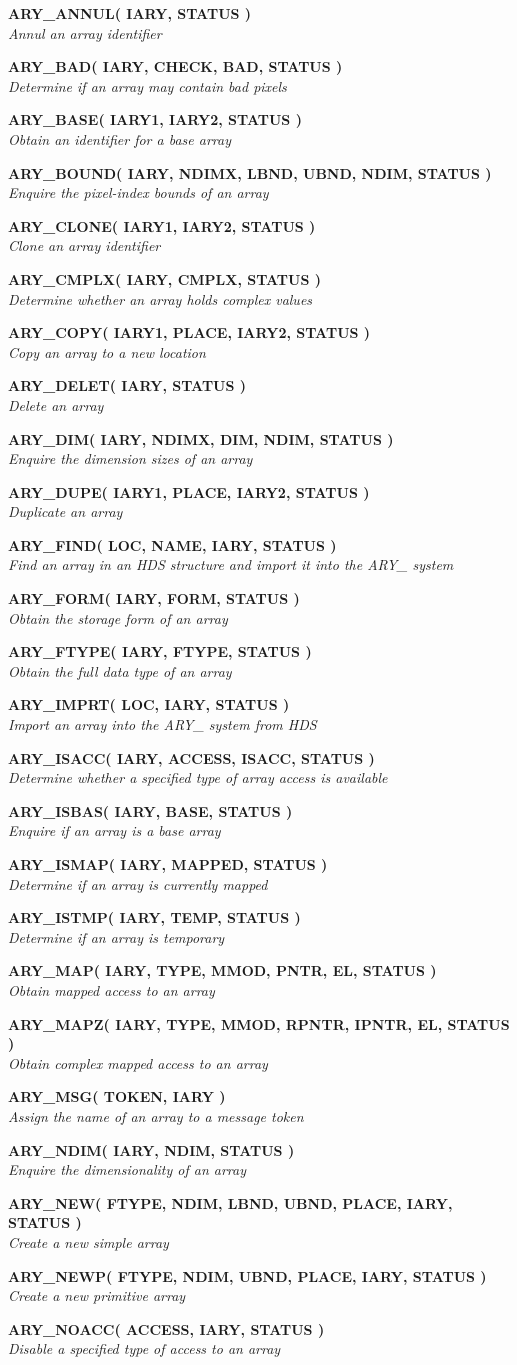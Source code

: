 \documentclass[twoside,11pt]{article}
\newcommand{\noteroutine}[2]{\textbf{#1}\hspace*{\fill}\nopagebreak \\
                             \hspace*{3em}\emph{#2}\hspace*{\fill}\par}
\begin{document}
\noteroutine{ARY\_ANNUL( IARY, STATUS )}
            {Annul an array identifier}
\noteroutine{ARY\_BAD( IARY, CHECK, BAD, STATUS )}
            {Determine if an array may contain bad pixels}
\noteroutine{ARY\_BASE( IARY1, IARY2, STATUS )}
            {Obtain an identifier for a base array}
\noteroutine{ARY\_BOUND( IARY, NDIMX, LBND, UBND, NDIM, STATUS )}
            {Enquire the pixel-index bounds of an array}
\noteroutine{ARY\_CLONE( IARY1, IARY2, STATUS )}
            {Clone an array identifier}
\noteroutine{ARY\_CMPLX( IARY, CMPLX, STATUS )}
            {Determine whether an array holds complex values}
\noteroutine{ARY\_COPY( IARY1, PLACE, IARY2, STATUS )}
            {Copy an array to a new location}
\noteroutine{ARY\_DELET( IARY, STATUS )}
            {Delete an array}
\noteroutine{ARY\_DIM( IARY, NDIMX, DIM, NDIM, STATUS )}
            {Enquire the dimension sizes of an array}
\noteroutine{ARY\_DUPE( IARY1, PLACE, IARY2, STATUS )}
            {Duplicate an array}
\noteroutine{ARY\_FIND( LOC, NAME, IARY, STATUS )}
            {Find an array in an HDS structure and import it into the ARY\_ system}
\noteroutine{ARY\_FORM( IARY, FORM, STATUS )}
            {Obtain the storage form of an array}
\noteroutine{ARY\_FTYPE( IARY, FTYPE, STATUS )}
            {Obtain the full data type of an array}
\noteroutine{ARY\_IMPRT( LOC, IARY, STATUS )}
            {Import an array into the ARY\_ system from HDS}
\noteroutine{ARY\_ISACC( IARY, ACCESS, ISACC, STATUS )}
            {Determine whether a specified type of array access is available}
\noteroutine{ARY\_ISBAS( IARY, BASE, STATUS )}
            {Enquire if an array is a base array}
\noteroutine{ARY\_ISMAP( IARY, MAPPED, STATUS )}
            {Determine if an array is currently mapped}
\noteroutine{ARY\_ISTMP( IARY, TEMP, STATUS )}
            {Determine if an array is temporary}
\noteroutine{ARY\_MAP( IARY, TYPE, MMOD, PNTR, EL, STATUS )}
            {Obtain mapped access to an array}
\noteroutine{ARY\_MAPZ( IARY, TYPE, MMOD, RPNTR, IPNTR, EL, STATUS )}
            {Obtain complex mapped access to an array}
\noteroutine{ARY\_MSG( TOKEN, IARY )}
            {Assign the name of an array to a message token}
\noteroutine{ARY\_NDIM( IARY, NDIM, STATUS )}
            {Enquire the dimensionality of an array}
\noteroutine{ARY\_NEW( FTYPE, NDIM, LBND, UBND, PLACE, IARY, STATUS )}
            {Create a new simple array}
\noteroutine{ARY\_NEWP( FTYPE, NDIM, UBND, PLACE, IARY, STATUS )}
            {Create a new primitive array}
\noteroutine{ARY\_NOACC( ACCESS, IARY, STATUS )}
            {Disable a specified type of access to an array}
\end{document}
